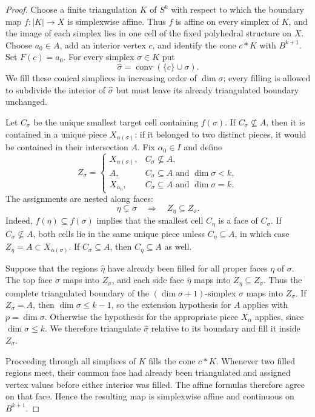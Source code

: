 \documentclass[11pt,reqno]{amsart}
\numberwithin{equation}{section}
\theoremstyle{definition}
\theoremstyle{remark}
\begin{document}
\begin{proof}
Choose a finite triangulation $K$ of $S^k$ with respect to which the
boundary map $f:|K|\to X$ is simplexwise affine.  Thus $f$ is affine on
every simplex of $K$, and the image of each simplex lies in one cell of the
fixed polyhedral structure on $X$.
Choose $a_0\in A$, add an interior vertex $c$, and identify the cone
$c*K$ with $B^{k+1}$.  Set $F(c)=a_0$.  For every simplex $\sigma\in K$ put
\[
 \widehat\sigma=\operatorname{conv}(\{c\}\cup\sigma).
\]
We fill these conical simplices in increasing order of $\dim\sigma$; every
filling is allowed to subdivide the interior of $\widehat\sigma$ but must
leave its already triangulated boundary unchanged.

Let $C_\sigma$ be the unique smallest target cell containing
$f(\sigma)$.  If $C_\sigma\not\subseteq A$, then it is contained in a unique
piece $X_{\alpha(\sigma)}$: if it belonged to two distinct pieces, it would
be contained in their intersection $A$.  Fix $\alpha_0\in I$ and define
\[
 Z_\sigma=
 \begin{cases}
 X_{\alpha(\sigma)},&C_\sigma\not\subseteq A,\\
 A,&C_\sigma\subseteq A\text{ and }\dim\sigma<k,\\
 X_{\alpha_0},&C_\sigma\subseteq A\text{ and }\dim\sigma=k.
 \end{cases}
\]
The assignments are nested along faces:
\begin{equation}\label{eq:carrier-nesting}
 \eta\subsetneq\sigma\quad\Longrightarrow\quad Z_\eta\subseteq Z_\sigma.
\end{equation}
Indeed, $f(\eta)\subseteq f(\sigma)$ implies that the smallest cell
$C_\eta$ is a face of $C_\sigma$.  If $C_\sigma\not\subseteq A$, both cells
lie in the same unique piece unless $C_\eta\subseteq A$, in which case
$Z_\eta=A\subset X_{\alpha(\sigma)}$.  If $C_\sigma\subseteq A$, then
$C_\eta\subseteq A$ as well.

Suppose that the regions $\widehat\eta$ have already been filled for all
proper faces $\eta$ of $\sigma$.  The top face $\sigma$ maps into
$Z_\sigma$, and each side face $\widehat\eta$ maps into
$Z_\eta\subseteq Z_\sigma$.  Thus the complete triangulated boundary of the
$(\dim\sigma+1)$-simplex $\widehat\sigma$ maps into $Z_\sigma$.  If
$Z_\sigma=A$, then $\dim\sigma\le k-1$, so the extension hypothesis for $A$
applies with $p=\dim\sigma$.  Otherwise the hypothesis for the appropriate
piece $X_\alpha$ applies, since $\dim\sigma\le k$.  We therefore triangulate
$\widehat\sigma$ relative to its boundary and fill it inside $Z_\sigma$.

Proceeding through all simplices of $K$ fills the cone $c*K$.  Whenever two
filled regions meet, their common face had already been triangulated and
assigned vertex values before either interior was filled.  The affine
formulas therefore agree on that face.  Hence the resulting map is
simplexwise affine and continuous on $B^{k+1}$.
\end{proof}
\end{document}
